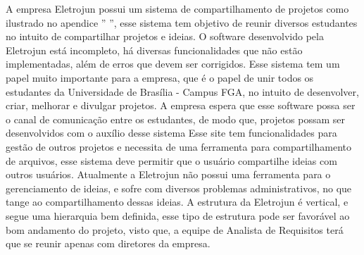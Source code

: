 A empresa Eletrojun possui um sistema de compartilhamento de projetos como ilustrado no apendice '' ”, esse sistema tem objetivo de reunir diversos estudantes no intuito de compartilhar projetos e ideias.
O software desenvolvido pela Eletrojun está incompleto, há diversas funcionalidades que não estão implementadas, além de erros que devem ser corrigidos. Esse sistema tem um papel muito importante para a empresa, que é o papel de unir todos os estudantes da Universidade de Brasília - Campus FGA, no intuito de desenvolver, criar, melhorar e divulgar projetos. A empresa espera que esse software possa ser o canal de comunicação entre os estudantes, de modo que, projetos possam ser desenvolvidos com o auxílio desse sistema
Esse site tem funcionalidades para gestão de outros projetos e necessita de uma ferramenta para compartilhamento de arquivos, esse sistema deve permitir que o usuário compartilhe ideias com outros usuários.
Atualmente a Eletrojun não possui uma ferramenta para o gerenciamento de ideias, e sofre com diversos problemas administrativos, no que tange ao
compartilhamento dessas ideias.
A estrutura da Eletrojun é vertical, e segue uma hierarquia bem definida, esse tipo de estrutura pode ser favorável ao bom andamento do projeto, visto que, a equipe de Analista de Requisitos terá que se reunir apenas com diretores da empresa. 
